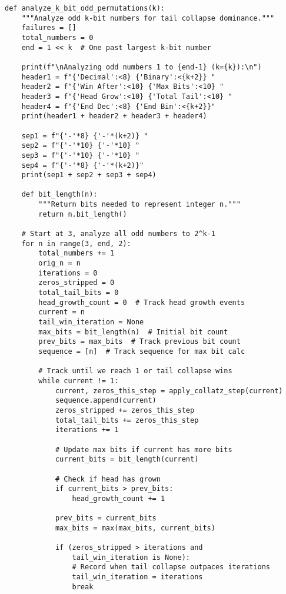 \documentclass[10pt,letterpaper]{article}
\begin{document}
\begin{lstlisting}
def analyze_k_bit_odd_permutations(k):
    """Analyze odd k-bit numbers for tail collapse dominance."""
    failures = []
    total_numbers = 0
    end = 1 << k  # One past largest k-bit number

    print(f"\nAnalyzing odd numbers 1 to {end-1} (k={k}):\n")
    header1 = f"{'Decimal':<8} {'Binary':<{k+2}} "
    header2 = f"{'Win After':<10} {'Max Bits':<10} "
    header3 = f"{'Head Grow':<10} {'Total Tail':<10} "
    header4 = f"{'End Dec':<8} {'End Bin':<{k+2}}"
    print(header1 + header2 + header3 + header4)
    
    sep1 = f"{'-'*8} {'-'*(k+2)} "
    sep2 = f"{'-'*10} {'-'*10} "
    sep3 = f"{'-'*10} {'-'*10} "
    sep4 = f"{'-'*8} {'-'*(k+2)}"
    print(sep1 + sep2 + sep3 + sep4)
    
    def bit_length(n):
        """Return bits needed to represent integer n."""
        return n.bit_length()

    # Start at 3, analyze all odd numbers to 2^k-1
    for n in range(3, end, 2):  
        total_numbers += 1
        orig_n = n
        iterations = 0
        zeros_stripped = 0
        total_tail_bits = 0
        head_growth_count = 0  # Track head growth events
        current = n
        tail_win_iteration = None
        max_bits = bit_length(n)  # Initial bit count
        prev_bits = max_bits  # Track previous bit count
        sequence = [n]  # Track sequence for max bit calc
        
        # Track until we reach 1 or tail collapse wins
        while current != 1:
            current, zeros_this_step = apply_collatz_step(current)
            sequence.append(current)
            zeros_stripped += zeros_this_step
            total_tail_bits += zeros_this_step  
            iterations += 1
            
            # Update max bits if current has more bits
            current_bits = bit_length(current)
            
            # Check if head has grown
            if current_bits > prev_bits:
                head_growth_count += 1
                
            prev_bits = current_bits
            max_bits = max(max_bits, current_bits)

            if (zeros_stripped > iterations and 
                tail_win_iteration is None):
                # Record when tail collapse outpaces iterations
                tail_win_iteration = iterations  
                break


\end{lstlisting}
\end{document}
